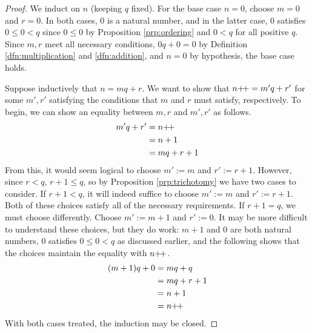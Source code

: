 \documentclass[../main.tex]{subfiles}
\begin{document}
\begin{enumerate}[ref={\thesection.\arabic*}]
\begin{prop}
        \begin{proof}
            We induct on $n$ (keeping $q$ fixed). For the base case $n=0$, choose $m=0$ and $r=0$. In both cases, 0 is a natural number, and in the latter case, 0 satisfies $0\leq 0<q$ since $0\leq 0$ by Proposition \ref{prp:ordering} and $0<q$ for all positive $q$. Since $m,r$ meet all necessary conditions, $0q+0=0$ by Definition \ref{dfn:multiplication} and \ref{dfn:addition}, and $n=0$ by hypothesis, the base case holds.\par
            Suppose inductively that $n=mq+r$. We want to show that $n{+\!+}=m'q+r'$ for some $m',r'$ satisfying the conditions that $m$ and $r$ must satisfy, respectively. To begin, we can show an equality between $m,r$ and $m',r'$ as follows.
            \begin{align*}
                m'q+r' &= n{+\!+}\\
                &= n+1\\
                &= mq+r+1
            \end{align*}
            From this, it would seem logical to choose $m':=m$ and $r':=r+1$. However, since $r<q$, $r+1\leq q$, so by Proposition \ref{prp:trichotomy} we have two cases to consider. If $r+1<q$, it will indeed suffice to choose $m':=m$ and $r':=r+1$. Both of these choices satisfy all of the necessary requirements. If $r+1=q$, we must choose differently. Choose $m':=m+1$ and $r':=0$. It may be more difficult to understand these choices, but they do work: $m+1$ and $0$ are both natural numbers, 0 satisfies $0\leq 0<q$ as discussed earlier, and the following shows that the choices maintain the equality with $n{+\!+}$.
            \begin{align*}
                (m+1)q+0 &= mq+q\\
                &= mq+r+1\\
                &= n+1\\
                &= n{+\!+}
            \end{align*}
            With both cases treated, the induction may be closed.
        \end{proof}
    \end{prop}
\end{enumerate}
\end{document}
